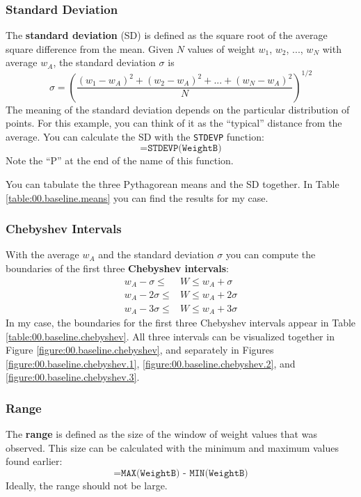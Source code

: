 \subsubsection{Standard Deviation}
%
The \textbf{standard deviation} (SD) is defined as the square root of the average square difference from the mean. Given $N$ values of weight $w_{1}$, $w_{2}$, ..., $w_{N}$ with average $w_{A}$, the standard deviation $\sigma$ is
\begin{equation}
    \sigma = \left( \frac{(w_{1} - w_{A})^{2} + (w_{2} - w_{A})^{2} + ... + (w_{N} - w_{A})^{2}}{N}  \right)^{1/2}
\end{equation}
The meaning of the standard deviation depends on the particular distribution of points. For this example, you can think of it as the ``typical'' distance from the average. You can calculate the SD with the \texttt{STDEVP} function:
\begin{equation}
    \texttt{=STDEVP(WeightB)}
\end{equation}
Note the ``P'' at the end of the name of this function.

You can tabulate the three Pythagorean means and the SD together. In Table \ref{table:00.baseline.means} you can find the results for my case.
%
\subsubsection{Chebyshev Intervals}
%
With the average $w_{A}$ and the standard deviation $\sigma$ you can compute the boundaries of the first three \textbf{Chebyshev intervals}:
\begin{align}
    w_{A} - \sigma \leq {}&W \leq w_{A} + \sigma \\
    w_{A} - 2\sigma \leq {}&W \leq w_{A} + 2\sigma \\
    w_{A} - 3\sigma \leq {}&W \leq w_{A} + 3\sigma
\end{align}
In my case, the boundaries for the first three Chebyshev intervals appear in Table \ref{table:00.baseline.chebyshev}. All three intervals can be visualized together in Figure \ref{figure:00.baseline.chebyshev}, and separately in Figures \ref{figure:00.baseline.chebyshev.1}, \ref{figure:00.baseline.chebyshev.2}, and \ref{figure:00.baseline.chebyshev.3}.
%
\subsubsection{Range}
%
The \textbf{range} is defined as the size of the window of weight values that was observed. This size can be calculated with the minimum and maximum values found earlier:
\begin{equation}
    \texttt{=MAX(WeightB) - MIN(WeightB)}
\end{equation}
Ideally, the range should not be large.
%
